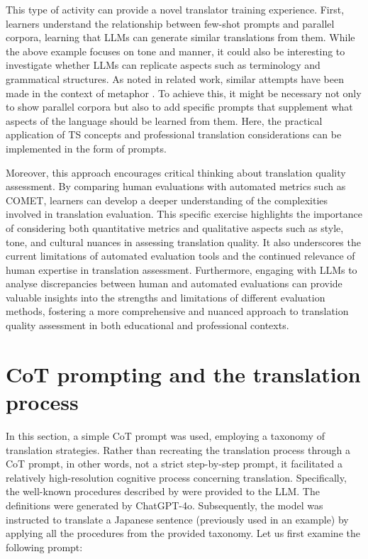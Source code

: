 \documentclass[output=paper,colorlinks,citecolor=brown, japanesefont]{langscibook}
\begin{document}
This type of activity can provide a novel translator training experience. First, learners understand the relationship between few-shot prompts and parallel corpora, learning that LLMs can generate similar translations from them. While the above example focuses on tone and manner, it could also be interesting to investigate whether LLMs can replicate aspects such as terminology and grammatical structures. As noted in related work, similar attempts have been made in the context of metaphor
\citep{Dorst2024}. To achieve this, it might be necessary not only to show parallel corpora but also to add specific prompts that supplement what aspects of the language should be learned from them. Here, the practical application of TS concepts and professional translation considerations can be implemented in the form of prompts.

Moreover, this approach encourages critical thinking about translation quality assessment. By comparing human evaluations with automated metrics such as COMET, learners can develop a deeper understanding of the complexities involved in translation evaluation. This specific exercise highlights the importance of considering both quantitative metrics and qualitative aspects such as style, tone, and cultural nuances in assessing translation quality. It also underscores the current limitations of automated evaluation tools and the continued relevance of human expertise in translation assessment. Furthermore, engaging with LLMs to analyse discrepancies between human and automated evaluations can provide valuable insights into the strengths and limitations of different evaluation methods, fostering a more comprehensive and nuanced approach to translation quality assessment in both educational and professional contexts.

\section{CoT prompting and the translation process}
In this section, a simple CoT prompt was used, employing a taxonomy of translation strategies. Rather than recreating the translation process through a CoT prompt, in other words, not a strict step-by-step prompt, it facilitated a relatively high-resolution cognitive process concerning translation. Specifically, the well-known procedures described by \citet{Vinay1995} were provided to the LLM. The definitions were generated by ChatGPT-4o. Subsequently, the model was instructed to translate a Japanese sentence (previously used in an example) by applying all the procedures from the provided taxonomy. Let us first examine the following prompt:
\end{document}
